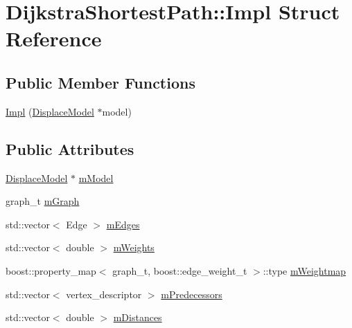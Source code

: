 \hypertarget{struct_dijkstra_shortest_path_1_1_impl}{}\section{Dijkstra\+Shortest\+Path\+::Impl Struct Reference}
\label{struct_dijkstra_shortest_path_1_1_impl}
\subsection*{Public Member Functions}
\begin{DoxyCompactItemize}
\item 
\mbox{\hyperlink{struct_dijkstra_shortest_path_1_1_impl_ab5a6de3138d090f53a6f77b3fe439351}{Impl}} (\mbox{\hyperlink{class_displace_model}{Displace\+Model}} $\ast$model)
\end{DoxyCompactItemize}
\subsection*{Public Attributes}
\begin{DoxyCompactItemize}
\item 
\mbox{\hyperlink{class_displace_model}{Displace\+Model}} $\ast$ \mbox{\hyperlink{struct_dijkstra_shortest_path_1_1_impl_ab42731721f0b24366fece3a5bd2a6bb3}{m\+Model}}
\item 
graph\+\_\+t \mbox{\hyperlink{struct_dijkstra_shortest_path_1_1_impl_abf60d5a676926564ed05d4eb777f9b4d}{m\+Graph}}
\item 
std\+::vector$<$ Edge $>$ \mbox{\hyperlink{struct_dijkstra_shortest_path_1_1_impl_a7d076fa8c50667efb08a871c0f338d3e}{m\+Edges}}
\item 
std\+::vector$<$ double $>$ \mbox{\hyperlink{struct_dijkstra_shortest_path_1_1_impl_a870a9acd188de69c5672cb72f9d8f809}{m\+Weights}}
\item 
boost\+::property\+\_\+map$<$ graph\+\_\+t, boost\+::edge\+\_\+weight\+\_\+t $>$\+::type \mbox{\hyperlink{struct_dijkstra_shortest_path_1_1_impl_a0a89b8af2c4229a920778306aa8647f1}{m\+Weightmap}}
\item 
std\+::vector$<$ vertex\+\_\+descriptor $>$ \mbox{\hyperlink{struct_dijkstra_shortest_path_1_1_impl_ac3af7d3acae25b1a0cd4a824b8317f1a}{m\+Predecessors}}
\item 
std\+::vector$<$ double $>$ \mbox{\hyperlink{struct_dijkstra_shortest_path_1_1_impl_adf3aa8e25e553772e3c9d15f931525bd}{m\+Distances}}
\end{DoxyCompactItemize}



